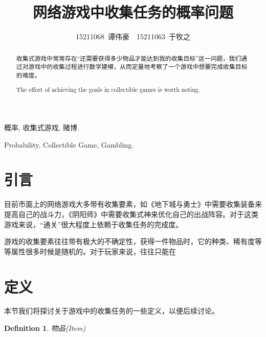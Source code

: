 \documentclass[10pt,journal,compsoc]{IEEEtran}
\begin{document}
\title{网络游戏中收集任务的概率问题}

\author{15211068~谭伟豪~~15211063~于牧之}

\maketitle

\newtheorem{definition}{Definition}
\renewcommand{\abstractname}{摘 要}
\renewcommand{\figurename}{图}
\renewcommand{\tablename}{表}
\renewcommand{\IEEEkeywordsname}{关键词}
\begin{abstract}
收集式游戏中常常存在“还需要获得多少物品才能达到我的收集目标”这一问题，我们通过对游戏中的收集过程进行数学建模，从而定量地考察了一个游戏中想要完成收集目标的难度。
\end{abstract}
\renewcommand{\abstractname}{Abstract}
\begin{abstract}
The effort of achieving the goals in collectible games is worth noting. 
\end{abstract}

\begin{IEEEkeywords}
概率, 收集式游戏, 赌博.
\end{IEEEkeywords}
\renewcommand{\IEEEkeywordsname}{Keywords}
\begin{IEEEkeywords}
Probability, Collectible Game, Gambling.
\end{IEEEkeywords}

\section{引言}

目前市面上的网络游戏大多带有收集要素，如《地下城与勇士》中需要收集装备来提高自己的战斗力，《阴阳师》中需要收集式神来优化自己的出战阵容。对于这类游戏来说，“通关”很大程度上依赖于收集任务的完成度。

游戏的收集要素往往带有极大的不确定性，获得一件物品时，它的种类、稀有度等等属性很多时候是随机的。对于玩家来说，往往只能在



\section{定义}

本节我们将探讨关于游戏中的收集任务的一些定义，以便后续讨论。

\begin{definition}
  物品(Item)
\end{definition}
\end{document}
